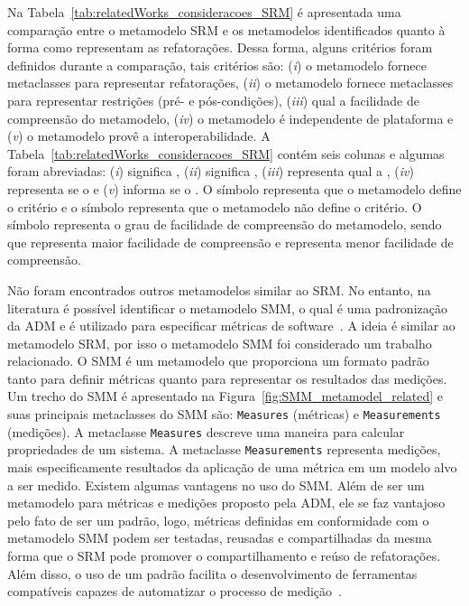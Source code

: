 Na Tabela~\ref{tab:relatedWorks_consideracoes_SRM} é apresentada uma comparação entre o metamodelo SRM e os metamodelos identificados quanto à forma como representam as refatorações. Dessa forma, alguns critérios foram definidos durante a comparação, tais critérios são: (\textit{i}) o metamodelo fornece metaclasses para representar refatorações, (\textit{ii}) o metamodelo fornece metaclasses para representar restrições (pré- e pós-condições), (\textit{iii}) qual a facilidade de compreensão do metamodelo, (\textit{iv}) o metamodelo é independente de plataforma e (\textit{v}) o metamodelo provê a interoperabilidade. A Tabela~\ref{tab:relatedWorks_consideracoes_SRM} contém seis colunas e algumas foram abreviadas: (\textit{i})  significa , (\textit{ii})  significa , (\textit{iii})  representa qual a , (\textit{iv})  representa se o  e (\textit{v})  informa se o . O símbolo  representa que o metamodelo define o critério e o símbolo  representa que o metamodelo não define o critério. O símbolo \aspas{+} representa o grau de facilidade de compreensão do metamodelo, sendo que \aspas{+++} representa maior facilidade de compreensão e \aspas{+} representa menor facilidade de compreensão.




Não foram encontrados outros metamodelos similar ao SRM. No entanto, na literatura é possível identificar o metamodelo SMM, o qual é uma padronização da ADM e é utilizado para especificar métricas de software~\cite{ADM:SMM}. A ideia é similar ao metamodelo SRM, por isso o metamodelo SMM foi considerado um trabalho relacionado. O SMM é um metamodelo que proporciona um formato padrão tanto para definir métricas quanto para representar os resultados das medições. Um trecho do SMM é apresentado na Figura~\ref{fig:SMM_metamodel_related} e suas principais metaclasses do SMM são: \texttt{Measures} (métricas) e \texttt{Measurements} (medições). A metaclasse \texttt{Measures} descreve uma maneira para calcular propriedades de um sistema. A metaclasse \texttt{Measurements} representa medições, mais especificamente resultados da aplicação de uma métrica em um modelo alvo a ser medido. Existem algumas vantagens no uso do SMM. Além de ser um metamodelo para métricas e medições proposto pela ADM, ele se faz vantajoso pelo fato de ser um padrão, logo, métricas definidas em conformidade com o metamodelo SMM podem ser testadas, reusadas e compartilhadas da mesma forma que o SRM pode promover o compartilhamento e reúso de refatorações. Além disso, o uso de um padrão facilita o desenvolvimento de ferramentas compatíveis capazes de automatizar o processo de medição~\cite{ADM:SMM}.

